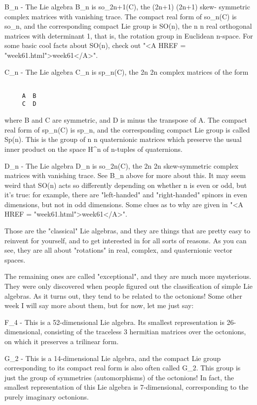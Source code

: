 B_{n} - The Lie algebra B_{n} is
so_{2n+1}(C), the (2n+1) \times  (2n+1) skew- symmetric complex
matrices with vanishing trace.  The compact real form of
so_{n}(C) is so_{n}, and the corresponding compact Lie
group is SO(n), the n \times  n real orthogonal matrices with determinant 1,
that is, the rotation group in Euclidean n-space.  For some basic cool
facts about SO(n), check out "<A HREF = "week61.html">week61</A>".

C_{n} - The Lie algebra C_{n} is sp_{n}(C),
the 2n \times  2n complex matrices of the form


\begin{verbatim}

     A  B
     C  D
\end{verbatim}
    

where B and C are symmetric, and D is minus the transpose of A.  The
compact real form of sp_{n}(C) is sp_{n}, and the
corresponding compact Lie group is called Sp(n).  This is the group of
n \times  n quaternionic matrices which preserve the usual inner product on
the space H^{n} of n-tuples of quaternions.

D_{n} - The Lie algebra D_{n} is so_{2n}(C),
the 2n \times  2n skew-symmetric complex matrices with vanishing trace.  See
B_{n} above for more about this.  It may seem weird that SO(n)
acts so differently depending on whether n is even or odd, but it's
true: for example, there are "left-handed" and "right-handed" spinors
in even dimensions, but not in odd dimensions.  Some clues as to why
are given in "<A HREF = "week61.html">week61</A>".

Those are the "classical" Lie algebras, and they are things that are
pretty easy to reinvent for yourself, and to get interested in for all
sorts of reasons.  As you can see, they are all about "rotations" in 
real, complex, and quaternionic vector spaces.  

The remaining ones are called "exceptional", and they are much more
mysterious.  They were only discovered when people figured out the
classification of simple Lie algebras.  As it turns out, they tend to be
related to the octonions!  Some other week I will say more about them,
but for now, let me just say:

F_{4} - This is a 52-dimensional Lie algebra.  Its smallest
representation is 26-dimensional, consisting of the traceless
3 hermitian matrices over the octonions, on which it preserves
a trilinear form.  

G_{2} - This is a 14-dimensional Lie algebra, and the
compact Lie group corresponding to its compact real form is also often
called G_{2}.  This group is just the group of symmetries
(automorphisms) of the octonions!  In fact, the smallest
representation of this Lie algebra is 7-dimensional, corresponding to
the purely imaginary octonions.

